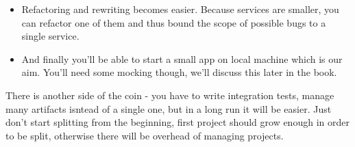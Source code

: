 \begin{itemize}
  \item Refactoring and rewriting becomes easier. Because services are smaller, you can refactor one of them and thus bound the scope of possible bugs to a single service.
  \item And finally you'll be able to start a small app on local machine which is our aim. You'll need some mocking though, we'll discuss this later in the book.
\end{itemize}
There is another side of the coin - you have to write integration tests, manage many artifacts isntead of a single one, but in a long run it will be easier. Just don't start splitting from the beginning, first project should grow enough in order to be split, otherwise there will be overhead of managing projects.

